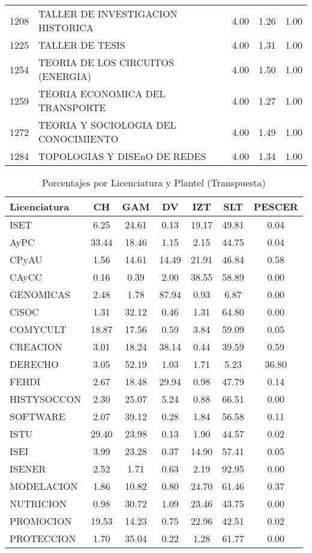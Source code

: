 \documentclass[12pt]{article}
\begin{document}
\begin{table}[ht]
\begin{tabular}{rlrrr}
  1208 & TALLER DE INVESTIGACION HISTORICA & 4.00 & 1.26 & 1.00 \\ 
  1225 & TALLER DE TESIS & 4.00 & 1.31 & 1.00 \\ 
  1254 & TEORIA DE LOS CIRCUITOS (ENERGIA) & 4.00 & 1.50 & 1.00 \\ 
  1259 & TEORIA ECONOMICA DEL TRANSPORTE & 4.00 & 1.27 & 1.00 \\ 
  1272 & TEORIA Y SOCIOLOGIA DEL CONOCIMIENTO & 4.00 & 1.49 & 1.00 \\ 
  1284 & TOPOLOGIAS Y DISEnO DE REDES & 4.00 & 1.34 & 1.00 \\ 
   \hline
\end{tabular}
\end{table}


\begin{table}[ht]
\centering
\caption{Porcentajes por Licenciatura y Plantel (Transpuesta)}
\label{tab:porcentajes_transpuesta}
\begin{tabular}{|l|c|c|c|c|c|c|}
\hline
Licenciatura & CH & GAM & DV & IZT & SLT & PESCER \\ \hline
ISET & 6.25 & 24.61 & 0.13 & 19.17 & 49.81 & 0.04 \\
AyPC & 33.44 & 18.46 & 1.15 & 2.15 & 44.75 & 0.04 \\
CPyAU & 1.56 & 14.61 & 14.49 & 21.91 & 46.84 & 0.58 \\
CAyCC & 0.16 & 0.39 & 2.00 & 38.55 & 58.89 & 0.00 \\
GENOMICAS & 2.48 & 1.78 & 87.94 & 0.93 & 6.87 & 0.00 \\
CiSOC & 1.31 & 32.12 & 0.46 & 1.31 & 64.80 & 0.00 \\
COMYCULT & 18.87 & 17.56 & 0.59 & 3.84 & 59.09 & 0.05 \\
CREACION & 3.01 & 18.24 & 38.14 & 0.44 & 39.59 & 0.59 \\
DERECHO & 3.05 & 52.19 & 1.03 & 1.71 & 5.23 & 36.80 \\
FEHDI & 2.67 & 18.48 & 29.94 & 0.98 & 47.79 & 0.14 \\
HISTYSOCCON & 2.30 & 25.07 & 5.24 & 0.88 & 66.51 & 0.00 \\
SOFTWARE & 2.07 & 39.12 & 0.28 & 1.84 & 56.58 & 0.11 \\
ISTU & 29.40 & 23.98 & 0.13 & 1.90 & 44.57 & 0.02 \\
ISEI & 3.99 & 23.28 & 0.37 & 14.90 & 57.41 & 0.05 \\
ISENER & 2.52 & 1.71 & 0.63 & 2.19 & 92.95 & 0.00 \\
MODELACION & 1.86 & 10.82 & 0.80 & 24.70 & 61.46 & 0.37 \\
NUTRICION & 0.98 & 30.72 & 1.09 & 23.46 & 43.75 & 0.00 \\
PROMOCION & 19.53 & 14.23 & 0.75 & 22.96 & 42.51 & 0.02 \\
PROTECCION & 1.70 & 35.04 & 0.22 & 1.28 & 61.77 & 0.00 \\
\hline
\end{tabular}
\end{table}
\end{document}
